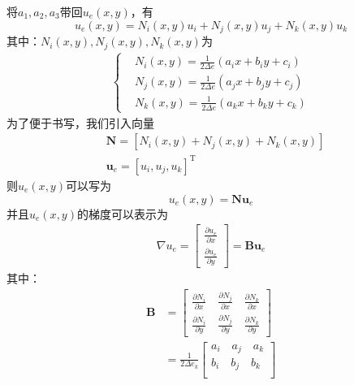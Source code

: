             将$a_1,a_2,a_3$带回$u_e(x,y)$，有
            \[
                u_e(x,y) = N_i(x,y)u_i + N_j(x,y)u_j + N_k(x,y)u_k
            \]
            其中：$N_i(x,y),N_j(x,y),N_k(x,y)$为
            \begin{align}
                \label{向量N的计算}
                \left\{
                \begin{aligned}
                    &N_i(x,y) = \frac{1}{2\Delta e} (a_ix + b_i y+c_i) \\
                    &N_j(x,y) = \frac{1}{2\Delta e} (a_jx + b_j y+c_j) \\
                    &N_k(x,y) = \frac{1}{2\Delta e} (a_kx + b_k y+c_k)
                \end{aligned}
                \right.
            \end{align}
            为了便于书写，我们引入向量
            \begin{align*}
                &\mathbf{N} = [N_i(x,y) + N_j(x,y) + N_k(x,y)] \\
                &\mathbf{u}_e = [u_i,u_j,u_k] ^\mathrm{T}
            \end{align*}
            则$u_e(x,y)$可以写为
            \[
                u_e(x,y) = \mathbf{N}\mathbf{u}_e
            \]
            并且$u_e(x,y)$的梯度可以表示为
            \begin{align*}
                \nabla u_e =
                \left[
                \begin{aligned}
                    \frac{\partial u_e}{\partial x} \\
                    \frac{\partial u_e}{\partial y}
                \end{aligned}
                \right]
                =\mathbf{B} \mathbf{u}_e
            \end{align*}
            其中：
            \begin{align*}
                \mathbf{B}
                &=
                \left[
                \begin{aligned}
                    \frac{\partial N_i}{\partial x} \quad \frac{\partial N_j}{\partial x} \quad \frac{\partial N_k}{\partial x}\\
                    \frac{\partial N_i}{\partial y} \quad\frac{\partial N_j}{\partial y} \quad \frac{\partial N_k}{\partial y}
                \end{aligned}
                \right] \\
                &=
                \frac{1}{2\Delta e_k}
                \left[
                \begin{aligned}
                    a_i \quad a_j \quad a_k\\
                    b_i \quad b_j \quad b_k\\
                \end{aligned}
                \right]
            \end{align*}

